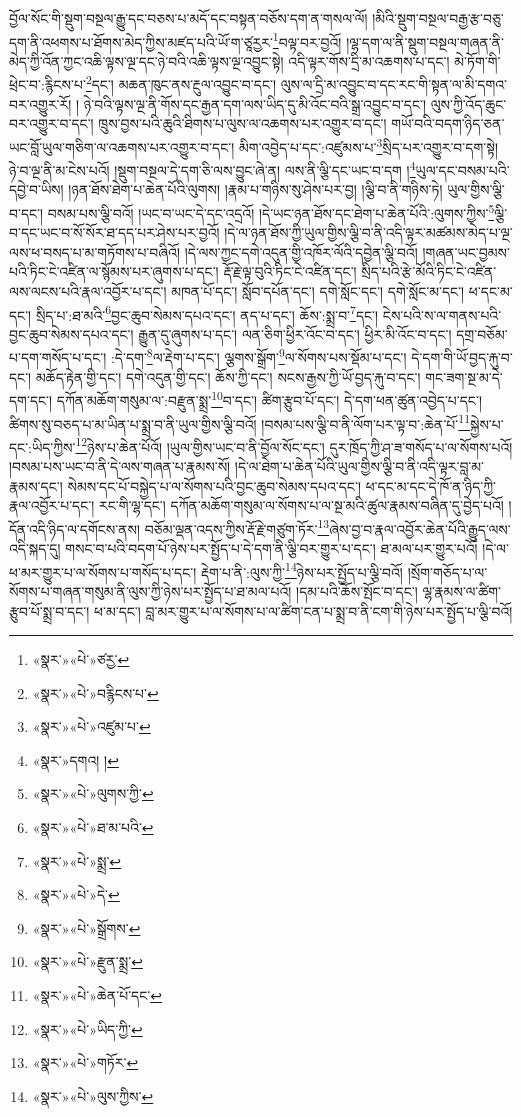 བྱོལ་སོང་གི་སྡུག་བསྔལ་རྒྱུ་དང་བཅས་པ་མདོ་དང་བསྟན་བཅོས་དག་ན་གསལ་ལོ། །མིའི་སྡུག་བསྔལ་བརྒྱ་རྩ་བཅུ་དག་ནི་འཕགས་པ་ཐོགས་མེད་ཀྱིས་མཛད་པའི་ཡོ་ག་ཙཱརྱར་\footnote{«སྣར་»«པེ་»ཙརྱ་}བལྟ་བར་བྱའོ། །ལྷ་དག་ལ་ནི་སྡུག་བསྔལ་གཞན་ནི་མེད་ཀྱི་འོན་ཀྱང་འཆི་ལྟས་ལྔ་དང་ཉེ་བའི་འཆི་ལྟས་ལྔ་འབྱུང་སྟེ། འདི་ལྟར་གོས་དྲི་མ་འཆགས་པ་དང་། མེ་ཏོག་གི་ཕྲེང་བ་:རྙིངས་པ་\footnote{«སྣར་»«པེ་»བརྙིངས་པ་}དང་། མཆན་ཁུང་ནས་རྔུལ་འབྱུང་བ་དང་། ལུས་ལ་དྲི་མ་འབྱུང་བ་དང་རང་གི་སྟན་ལ་མི་དགའ་བར་འགྱུར་རོ། །
ཉེ་བའི་ལྟས་ལྔ་ནི་གོས་དང་རྒྱན་དག་ལས་ཡིད་དུ་མི་འོང་བའི་སྒྲ་འབྱུང་བ་དང་། ལུས་ཀྱི་འོད་ཆུང་བར་འགྱུར་བ་དང་། ཁྲུས་བྱས་པའི་ཆུའི་ཐིགས་པ་ལུས་ལ་འཆགས་པར་འགྱུར་བ་དང་། གཡོ་བའི་བདག་ཉིད་ཅན་ཡང་བློ་ཡུལ་གཅིག་ལ་འཆགས་པར་འགྱུར་བ་དང་། མིག་འབྱེད་པ་དང་:འཛུམས་པ་\footnote{«སྣར་»«པེ་»འཛུམ་པ་}སྲིད་པར་འགྱུར་བ་དག་སྟེ། ཉེ་བ་ལྔ་ནི་མ་ངེས་པའོ། །སྡུག་བསྔལ་དེ་དག་ཅི་ལས་བྱུང་ཞེ་ན། ལས་ནི་ལྕི་དང་ཡང་བ་དག །\footnote{«སྣར་»དགའ། །}ཡུལ་དང་བསམ་པའི་དབྱེ་བ་ཡིས། །ཉན་ཐོས་ཐེག་པ་ཆེན་པོའི་ལུགས། །རྣམ་པ་གཉིས་སུ་ཤེས་པར་བྱ། །ལྕི་བ་ནི་གཉིས་ཏེ། ཡུལ་གྱིས་ལྕི་བ་དང་། བསམ་པས་ལྕི་བའོ། །ཡང་བ་ཡང་དེ་དང་འདྲའོ། །དེ་ཡང་ཉན་ཐོས་དང་ཐེག་པ་ཆེན་པོའི་:ལུགས་ཀྱིས་\footnote{«སྣར་»«པེ་»ལུགས་ཀྱི་}ལྕི་བ་དང་ཡང་བ་སོ་སོར་ཐ་དད་པར་ཤེས་པར་བྱའོ། །དེ་ལ་ཉན་ཐོས་ཀྱི་ཡུལ་གྱིས་ལྕི་བ་ནི་འདི་ལྟར་མཚམས་མེད་པ་ལྔ་ལས་ཕ་བསད་པ་མ་གཏོགས་པ་བཞིའོ། །དེ་ལས་ཀྱང་དགེ་འདུན་གྱི་འཁོར་ལོའི་དབྱེན་ལྕི་བའོ། །གཞན་ཡང་བྱམས་པའི་ཏིང་ངེ་འཛིན་ལ་སྙོམས་པར་ཞུགས་པ་དང་། རྡོ་རྗེ་ལྟ་བུའི་ཏིང་ངེ་འཛིན་དང་། སྲིད་པའི་རྩེ་མོའི་ཏིང་ངེ་འཛིན་ལས་ལངས་པའི་རྣལ་འབྱོར་པ་དང་། མཁན་པོ་དང་། སློབ་དཔོན་དང་། དགེ་སློང་དང་། དགེ་སློང་མ་དང་། ཕ་དང་མ་དང་། སྲིད་པ་:ཐ་མའི་\footnote{«སྣར་»«པེ་»ཐ་མ་པའི་}བྱང་ཆུབ་སེམས་དཔའ་དང་། ནད་པ་དང་། ཆོས་:སྨྲ་བ་\footnote{«སྣར་»«པེ་»སྨྲ་}དང་། ངེས་པའི་ས་ལ་གནས་པའི་བྱང་ཆུབ་སེམས་དཔའ་དང་། རྒྱུན་དུ་ཞུགས་པ་དང་། ལན་ཅིག་ཕྱིར་འོང་བ་དང་། ཕྱིར་མི་འོང་བ་དང་། དགྲ་བཅོམ་པ་དག་གསོད་པ་དང་། :དེ་དག་\footnote{«སྣར་»«པེ་»དེ་}ལ་རྡེག་པ་དང་། ལྕགས་སྒྲོག་\footnote{«སྣར་»«པེ་»སྒྲོགས་}ལ་སོགས་པས་སྡོམ་པ་དང་། དེ་དག་གི་ཡོ་བྱད་རྐུ་བ་དང་། མཆོད་རྟེན་གྱི་དང་། དགེ་འདུན་གྱི་དང་། ཆོས་ཀྱི་དང་། སངས་རྒྱས་ཀྱི་ཡོ་བྱད་རྐུ་བ་དང་། གང་ཟག་སྔ་མ་དེ་དག་དང་། དཀོན་མཆོག་གསུམ་ལ་:བརྫུན་སྨྲ་\footnote{«སྣར་»«པེ་»རྫུན་སྨྲ་}བ་དང་། ཚིག་རྩུབ་པོ་དང་། དེ་དག་ཕན་ཚུན་འབྱེད་པ་དང་། ཚིགས་སུ་བཅད་པ་མ་ཡིན་པ་སྨྲ་བ་ནི་ཡུལ་གྱིས་ལྕི་བའོ། །བསམ་པས་ལྕི་བ་ནི་ལོག་པར་ལྟ་བ་:ཆེན་པོ་\footnote{«སྣར་»«པེ་»ཆེན་པོ་དང་}སྐྱེས་པ་དང་:ཡིད་ཀྱིས་\footnote{«སྣར་»«པེ་»ཡིད་ཀྱི་}ཉེས་པ་ཆེན་པོའོ། །ཡུལ་གྱིས་ཡང་བ་ནི་བྱོལ་སོང་དང་། དུར་ཁྲོད་ཀྱི་ཤ་ཟ་གསོད་པ་ལ་སོགས་པའོ། །བསམ་པས་ཡང་བ་ནི་དེ་ལས་གཞན་པ་རྣམས་སོ། །དེ་ལ་ཐེག་པ་ཆེན་པོའི་ཡུལ་གྱིས་ལྕི་བ་ནི་འདི་ལྟར་བླ་མ་རྣམས་དང་། སེམས་དང་པོ་བསྐྱེད་པ་ལ་སོགས་པའི་བྱང་ཆུབ་སེམས་དཔའ་དང་། ཕ་དང་མ་དང་དེ་ཁོ་ན་ཉིད་ཀྱི་རྣལ་འབྱོར་པ་དང་། རང་གི་ལྷ་དང་། དཀོན་མཆོག་གསུམ་ལ་སོགས་པ་ལ་སྔ་མའི་ཚུལ་རྣམས་བཞིན་དུ་བྱེད་པའོ། །དོན་འདི་ཉིད་ལ་དགོངས་ནས། བཅོམ་ལྡན་འདས་ཀྱིས་རྡོ་རྗེ་གཙུག་ཏོར་\footnote{«སྣར་»«པེ་»གཏོར་}ཞེས་བྱ་བ་རྣལ་འབྱོར་ཆེན་པོའི་རྒྱུད་ལས་འདི་སྐད་དུ། གསང་བ་པའི་བདག་པོ་ཉེས་པར་སྤྱོད་པ་དེ་དག་ནི་ལྕི་བར་གྱུར་པ་དང་། ཐ་མལ་པར་གྱུར་པའོ། །དེ་ལ་ཕ་མར་གྱུར་པ་ལ་སོགས་པ་གསོད་པ་དང་། རྡེག་པ་ནི་:ལུས་ཀྱི་\footnote{«སྣར་»«པེ་»ལུས་ཀྱིས་}ཉེས་པར་སྤྱོད་པ་ལྕི་བའོ། །སྲོག་གཅོད་པ་ལ་སོགས་པ་གཞན་གསུམ་ནི་ལུས་ཀྱི་ཉེས་པར་སྤྱོད་པ་ཐ་མལ་པའོ། །དམ་པའི་ཆོས་སྤོང་བ་དང་། ལྷ་རྣམས་ལ་ཚིག་རྩུབ་པོ་སྨྲ་བ་དང་། ཕ་མ་དང་། བླ་མར་གྱུར་པ་ལ་སོགས་པ་ལ་ཚིག་ངན་པ་སྨྲ་བ་ནི་ངག་གི་ཉེས་པར་སྤྱོད་པ་ལྕི་བའོ། 